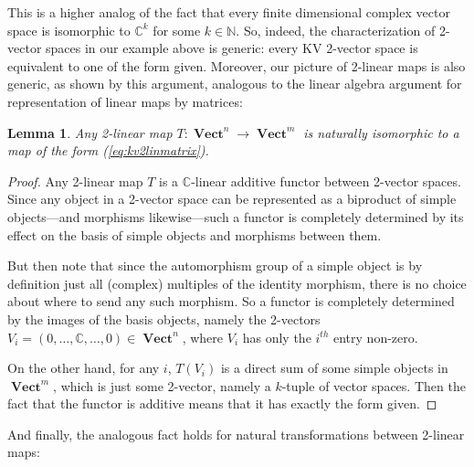 \documentclass[10pt]{amsart}
\numberwithin{theorem}{subsection}
\newtheorem{lemma}[theorem]{Lemma}
\newcommand{\ra}{\mathop{\rightarrow}}
\newcommand{\opname}[1]{\operatorname{#1}}
\newcommand{\catname}[1]{\boldsymbol{\opname{{#1}}}}
\newcommand{\V}{\catname{Vect}}
\begin{document}
This is a higher analog of the fact that every finite dimensional
complex vector space is isomorphic to $\mathbb{C}^k$ for some $k \in
\mathbb{N}$.  So, indeed, the characterization of 2-vector spaces in
our example above is generic: every KV 2-vector space is equivalent to
one of the form given.  Moreover, our picture of 2-linear maps is also
generic, as shown by this argument, analogous to the linear algebra
argument for representation of linear maps by matrices:

\begin{lemma}\label{lemma:kv2linmatrix} Any 2-linear map $T: \V^n \ra
\V^m$ is naturally isomorphic to a map of the form (\ref{eq:kv2linmatrix}).
\end{lemma}
\begin{proof}
Any 2-linear map $T$ is a $\mathbb{C}$-linear additive functor
between 2-vector spaces.  Since any object in a 2-vector space can be
represented as a biproduct of simple objects---and morphisms
likewise---such a functor is completely determined by its effect on
the basis of simple objects and morphisms between them.

But then note that since the automorphism group of a simple object is
by definition just all (complex) multiples of the identity morphism,
there is no choice about where to send any such morphism.  So a
functor is completely determined by the images of the basis objects,
namely the 2-vectors $V_i = (0,\dots,\mathbb{C},\dots,0) \in \V^n$,
where $V_i$ has only the $i^{th}$ entry non-zero.

On the other hand, for any $i$, $T(V_i)$ is a direct sum of some
simple objects in $\V^m$, which is just some 2-vector, namely a
$k$-tuple of vector spaces.  Then the fact that the functor is
additive means that it has exactly the form given.
\end{proof}

And finally, the analogous fact holds for natural transformations
between 2-linear maps:
\end{document}
